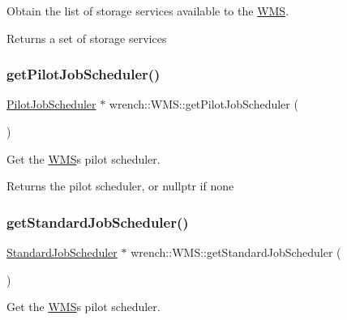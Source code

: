 Obtain the list of storage services available to the \hyperlink{classwrench_1_1_w_m_s}{W\+MS}. 

\begin{DoxyReturn}{Returns}
a set of storage services 
\end{DoxyReturn}
\mbox{\label{classwrench_1_1_w_m_s_ab84692140428dd81a6eccc115bf557e7}} 
\subsubsection{\texorpdfstring{get\+Pilot\+Job\+Scheduler()}{getPilotJobScheduler()}}
{\footnotesize\ttfamily \hyperlink{classwrench_1_1_pilot_job_scheduler}{Pilot\+Job\+Scheduler} $\ast$ wrench\+::\+W\+M\+S\+::get\+Pilot\+Job\+Scheduler (\begin{DoxyParamCaption}{ }\end{DoxyParamCaption})}



Get the \hyperlink{classwrench_1_1_w_m_s}{W\+MS}\textquotesingle{}s pilot scheduler. 

\begin{DoxyReturn}{Returns}
the pilot scheduler, or nullptr if none 
\end{DoxyReturn}
\mbox{\label{classwrench_1_1_w_m_s_ae350b1268c2122d5094852d3b6241e7a}} 
\subsubsection{\texorpdfstring{get\+Standard\+Job\+Scheduler()}{getStandardJobScheduler()}}
{\footnotesize\ttfamily \hyperlink{classwrench_1_1_standard_job_scheduler}{Standard\+Job\+Scheduler} $\ast$ wrench\+::\+W\+M\+S\+::get\+Standard\+Job\+Scheduler (\begin{DoxyParamCaption}{ }\end{DoxyParamCaption})}



Get the \hyperlink{classwrench_1_1_w_m_s}{W\+MS}\textquotesingle{}s pilot scheduler. 

